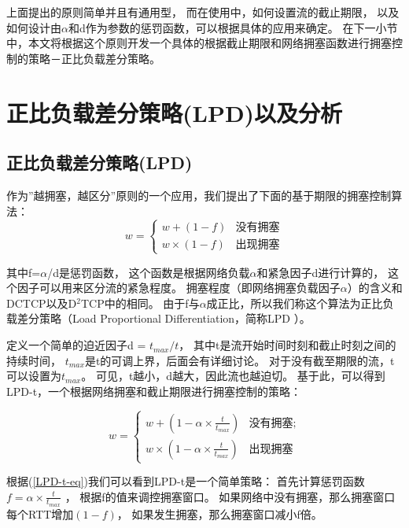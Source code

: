 上面提出的原则简单并且有通用型，
而在使用中，如何设置流的截止期限，
以及如何设计由$\alpha$和d作为参数的惩罚函数，可以根据具体的应用来确定。 
在下一小节中，本文将根据这个原则开发一个具体的根据截止期限和网络拥塞函数进行拥塞控制的策略－正比负载差分策略。

\section{正比负载差分策略(LPD)以及分析}
\label{sec_LPD:LPD}

\subsection{正比负载差分策略(LPD)}
作为”越拥塞，越区分”原则的一个应用，我们提出了下面的基于期限的拥塞控制算法：
\begin{equation}
w=
\begin{cases}
w+(1-f) &\text{没有拥塞}\\
w \times (1-f) &\text{出现拥塞}
\end{cases}
\label{LPD-CA-eq}
\end{equation}


其中f=$\alpha$/d是惩罚函数，
这个函数是根据网络负载$\alpha$和紧急因子d进行计算的，
这个因子可以用来区分流的紧急程度。
拥塞程度（即网络拥塞负载因子$\alpha$）的含义和DCTCP以及D$^2$TCP中的相同\cite{DCTCP, D2TCP}。 
由于f与$\alpha$成正比，所以我们称这个算法为正比负载差分策略（Load Proportional Differentiation，简称LPD ）。 

定义一个简单的迫近因子d = $t_{max}/t$，
其中t是流开始时间时刻和截止时刻之间的持续时间，
$t_{max}$是t的可调上界，后面会有详细讨论。
对于没有截至期限的流，t可以设置为$t_{max}$。 
可见，t越小，d越大，因此流也越迫切。
基于此，可以得到LPD-t，一个根据网络拥塞和截止期限进行拥塞控制的策略：

\begin{equation}
w=
\begin{cases}
w+(1-\alpha \times \frac{t}{t_{max}}) &\text{没有拥塞;}\\
w \times (1-\alpha \times \frac{t}{t_{max}}) &\text{出现拥塞}
\end{cases}
\label{LPD-t-eq}
\end{equation}


根据(\ref{LPD-t-eq})我们可以看到LPD-t是一个简单策略：
首先计算惩罚函数$f=\alpha \times \frac{t}{t_{max}}$ ，
根据f的值来调控拥塞窗口。
如果网络中没有拥塞，那么拥塞窗口每个RTT增加$(1-f)$，
如果发生拥塞，那么拥塞窗口减小f倍。
 
